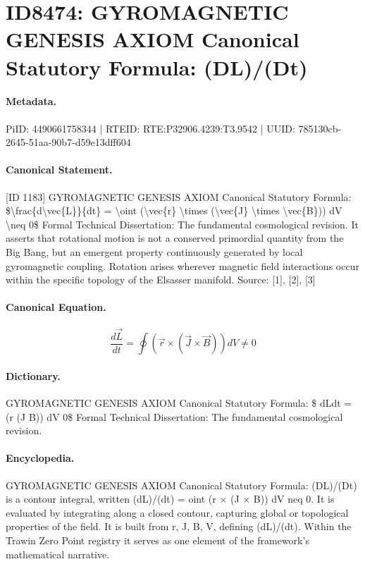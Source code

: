 \section*{ID8474: GYROMAGNETIC GENESIS AXIOM Canonical Statutory Formula: (DL)/(Dt)}
\paragraph{Metadata.}
PiID: 4490661758344 | RTEID: RTE:P32906.4239:T3.9542 | UUID: 785130cb-2645-51aa-90b7-d59e13dff604

\paragraph{Canonical Statement.}
[ID 1183] GYROMAGNETIC GENESIS AXIOM Canonical Statutory Formula: \$\textbackslash{}frac\{d\textbackslash{}vec\{L\}\}\{dt\} = \textbackslash{}oint (\textbackslash{}vec\{r\} \textbackslash{}times (\textbackslash{}vec\{J\} \textbackslash{}times \textbackslash{}vec\{B\})) dV \textbackslash{}neq 0\$ Formal Technical Dissertation: The fundamental cosmological revision. It asserts that rotational motion is not a conserved primordial quantity from the Big Bang, but an emergent property continuously generated by local gyromagnetic coupling. Rotation arises wherever magnetic field interactions occur within the specific topology of the Elsasser manifold. Source: [1], [2], [3]

\paragraph{Canonical Equation.}
\[
\frac{d\vec{L}}{dt} = \oint (\vec{r} \times (\vec{J} \times \vec{B})) dV \neq 0
\]

\paragraph{Dictionary.}
GYROMAGNETIC GENESIS AXIOM Canonical Statutory Formula: \$ dLdt = (r (J B)) dV 0\$ Formal Technical Dissertation: The fundamental cosmological revision.

\paragraph{Encyclopedia.}
GYROMAGNETIC GENESIS AXIOM Canonical Statutory Formula: (DL)/(Dt) is a contour integral, written (dL)/(dt) = oint (r × (J × B)) dV neq 0. It is evaluated by integrating along a closed contour, capturing global or topological properties of the field. It is built from r, J, B, V, defining (dL)/(dt). Within the Trawin Zero Point registry it serves as one element of the framework's mathematical narrative.
